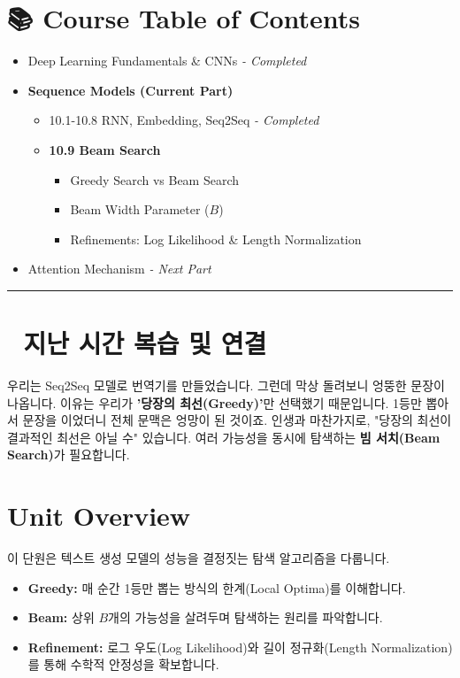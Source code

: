 \documentclass[11pt,a4paper]{book}
\theoremstyle{definition}
\begin{document}
\section*{📚 Course Table of Contents}
\begin{itemize}
    \item[Chapter 1-9.] Deep Learning Fundamentals \& CNNs \textit{- Completed}
    \item[\textbf{Chapter 10.}] \textbf{Sequence Models (Current Part)}
    \begin{itemize}
        \item 10.1-10.8 RNN, Embedding, Seq2Seq \textit{- Completed}
        \item \textbf{10.9 Beam Search}
        \begin{itemize}
            \item Greedy Search vs Beam Search
            \item Beam Width Parameter ($B$)
            \item Refinements: Log Likelihood \& Length Normalization
        \end{itemize}
    \end{itemize}
    \item[Chapter 11.] Attention Mechanism \textit{- Next Part}
\end{itemize}

\vspace{0.5cm}
\hrule
\vspace{0.5cm}

\section*{🔗 지난 시간 복습 및 연결}
우리는 Seq2Seq 모델로 번역기를 만들었습니다. 그런데 막상 돌려보니 엉뚱한 문장이 나옵니다.
이유는 우리가 \textbf{'당장의 최선(Greedy)'}만 선택했기 때문입니다. 1등만 뽑아서 문장을 이었더니 전체 문맥은 엉망이 된 것이죠.
인생과 마찬가지로, "당장의 최선이 결과적인 최선은 아닐 수" 있습니다. 여러 가능성을 동시에 탐색하는 \textbf{빔 서치(Beam Search)}가 필요합니다.

\section{Unit Overview}
\begin{summarybox}[title={핵심 목표}]
이 단원은 텍스트 생성 모델의 성능을 결정짓는 탐색 알고리즘을 다룹니다.
\begin{itemize}
    \item \textbf{Greedy:} 매 순간 1등만 뽑는 방식의 한계(Local Optima)를 이해합니다.
    \item \textbf{Beam:} 상위 $B$개의 가능성을 살려두며 탐색하는 원리를 파악합니다.
    \item \textbf{Refinement:} 로그 우도(Log Likelihood)와 길이 정규화(Length Normalization)를 통해 수학적 안정성을 확보합니다.
\end{itemize}
\end{summarybox}
\end{document}
